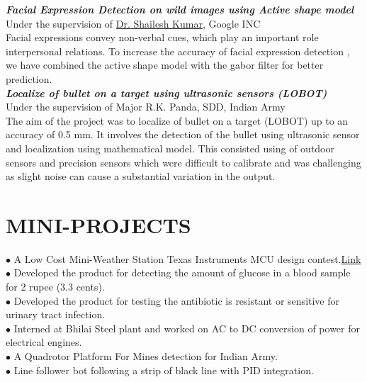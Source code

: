 \documentclass[a4paper,10pt]{article}
\begin{document}
{\sl \textbf{Facial Expression Detection on wild images using Active shape model}}\\
Under the supervision of \href{http://research.google.com/pubs/ShaileshKumar.html}{Dr. Shailesh Kumar}, Google INC  \\
Facial expressions convey non-verbal cues, which play an important role interpersonal relations. To increase the accuracy of facial expression detection , we have combined the active shape model with the gabor filter for better prediction. \\%
  {\sl \textbf{Localize of bullet on a target using ultrasonic sensors (LOBOT)}}\\
  Under the supervision of Major R.K. Panda, SDD, Indian Army\\
The aim of the project was to localize of bullet on a target (LOBOT) up to an
accuracy of 0.5 mm. It involves the detection of the bullet using ultrasonic
sensor and localization using mathematical model. This consisted using of
outdoor sensors and precision sensors which were difficult to calibrate and was
challenging as slight noise can cause a substantial variation in the output.
 \section{MINI-PROJECTS} 
$\bullet$ A Low Cost Mini-Weather Station Texas Instruments MCU design contest.\href{http://www.youtube.com/watch?v=kyFDzlU89iE}{Link} \\
$\bullet$ Developed the product for detecting the amount of glucose in a blood sample for 2 rupee (3.3 cents). \\
$\bullet$  Developed the product for testing the antibiotic is resistant or sensitive for urinary tract infection.\\
$\bullet$ Interned at Bhilai Steel plant and worked on AC to DC conversion of power for electrical engines.\\
$\bullet$ A Quadrotor Platform For Mines detection for Indian Army.\\
$\bullet$ Line follower bot following a strip of black line with PID integration.\\
\end{document}
